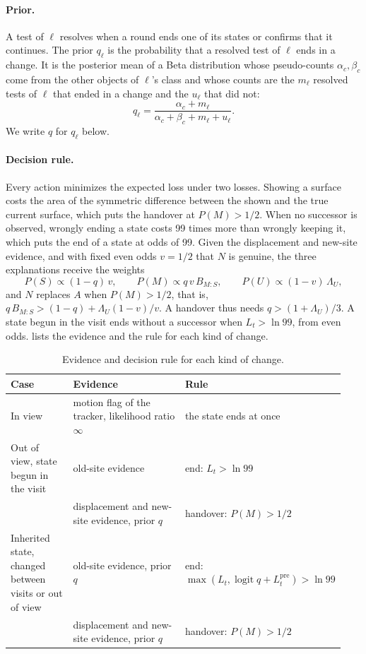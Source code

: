 \paragraph{Prior.}
A test of $\ell$ resolves when a round ends one of its states or confirms that it continues. The prior $q_\ell$ is the
probability that a resolved test of $\ell$ ends in a change. It is the posterior mean of a Beta distribution whose
pseudo-counts $\alpha_c, \beta_c$ come from the other objects of $\ell$'s class and whose counts are the $m_\ell$
resolved tests of $\ell$ that ended in a change and the $u_\ell$ that did not:
\begin{equation}
  q_\ell = \frac{\alpha_c + m_\ell}{\alpha_c + \beta_c + m_\ell + u_\ell}.
  \label{eq:prior}
\end{equation}
We write $q$ for $q_\ell$ below.

\paragraph{Decision rule.}
Every action minimizes the expected loss under two losses. Showing a surface costs the area of the symmetric difference
between the shown and the true current surface, which puts the handover at $P(M) > 1/2$. When no successor is
observed, wrongly ending a state costs 99 times more than wrongly keeping it, which puts the end of a state at odds of
99. Given the displacement and new-site evidence, and with fixed even odds $v = 1/2$ that $N$ is genuine, the three
explanations receive the weights
\begin{equation}
  P(S) \propto (1-q)\,v, \qquad P(M) \propto q\,v\,B_{M:S}, \qquad P(U) \propto (1-v)\,\Lambda_U,
  \label{eq:smu}
\end{equation}
and $N$ replaces $A$ when $P(M) > 1/2$, that is, $q\,B_{M:S} > (1-q) + \Lambda_U (1-v)/v$. A handover thus needs
$q > (1 + \Lambda_U)/3$. A state begun in the visit ends without a successor when $L_t > \ln 99$, from even odds.
 lists the evidence and the rule for each kind of change.

\begin{table}[t]
\centering\small
\caption{Evidence and decision rule for each kind of change.}
\label{tab:decisions}
\setlength{\tabcolsep}{3pt}
\begin{tabular}{@{}p{0.2\linewidth}p{0.38\linewidth}p{0.36\linewidth}@{}}
\toprule
Case & Evidence & Rule \\
\midrule
In view & motion flag of the tracker, likelihood ratio $\infty$ & the state ends at once \\
Out of view, state begun in the visit & old-site evidence & end: $L_t > \ln 99$ \\
 & displacement and new-site evidence, prior $q$ & handover: $P(M) > 1/2$ \\
Inherited state, changed between visits or out of view & old-site evidence, prior $q$ & end: $\max(L_t, \operatorname{logit} q + L^{\mathrm{pre}}_t) > \ln 99$ \\
 & displacement and new-site evidence, prior $q$ & handover: $P(M) > 1/2$ \\
\bottomrule
\end{tabular}
\end{table}

